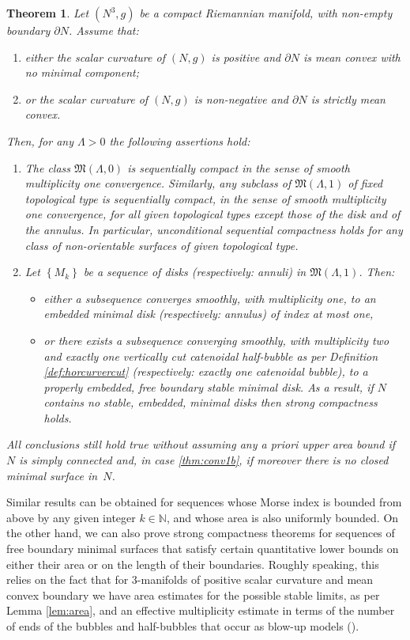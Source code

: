 \documentclass[JEP,XML,SOM,Unicode]{cedram}
\newenvironment{enumeratea}
{\bgroup\def\theenumi{\alph{enumi}}\begin{enumerate}}
{\end{enumerate}\egroup}
\newcounter{cas}
\newtheorem{thm}{Theorem}
\theoremstyle{definition}
\begin{document}
\begin{thm}\label{thm:conv1}
Let $(N^3,g)$ be a compact Riemannian manifold, with non-empty boundary $\partial N$. Assume that:
\begin{enumeratea}
\item\label{thm:conv1a}
\emph{either} the scalar curvature of $(N,g)$ is positive and $\partial N$ is mean convex with no minimal component;
\item\label{thm:conv1b}
\emph{or} the scalar curvature of $(N,g)$ is non-negative and $\partial N$ is strictly mean convex.
\end{enumeratea}
Then, for any $\Lambda>0$ the following assertions hold:
\begin{enumerate}
\item
The class $\mathfrak{M}(\Lambda,0)$ is sequentially compact in the sense of smooth multiplicity one convergence. Similarly, any subclass of $\mathfrak{M}(\Lambda, 1)$ of fixed topological type is sequen\-tially compact, in the sense of smooth multiplicity one convergence, for all given topological types except those of the disk and of the annulus. In particular, unconditional sequential compactness holds for any class of non-orientable surfaces of given topological type.

\item
Let $\left\{M_k\right\}$ be a sequence of disks (respectively: annuli) in $\mathfrak{M}(\Lambda, 1)$. Then:
\begin{itemize}
\item
\emph{either} a subsequence converges smoothly, with multiplicity one, to an embedded minimal disk (respectively: annulus) of index at most one,

\item
\emph{or} there exists a subsequence converging smoothly, with multiplicity two and exactly one vertically cut catenoidal half-bubble as per Definition \ref{def:horcurvercut} (respec\-tively: exactly one catenoidal bubble), to a properly embedded, free boundary stable minimal disk. As a result, if $N$ contains no stable, embedded, minimal disks then strong compactness holds.
\end{itemize}
\end{enumerate}
All conclusions still hold true without assuming any a priori upper area bound if~$N$ is simply connected and, in case \eqref{thm:conv1b}, if moreover there is no \emph{closed} minimal surface in~$N$.
\end{thm}

Similar results can be obtained for sequences whose Morse index is bounded from above by any given integer $k\in\mathbb{N}$, and whose area is also uniformly bounded. On the other hand, we can also prove strong compactness theorems for sequences of free boundary minimal surfaces that satisfy certain quantitative lower bounds on either their area or on the length of their boundaries. Roughly speaking, this relies on the fact that for 3-manifolds of positive scalar curvature and mean convex boundary we have area estimates for the possible stable limits, as per Lemma \ref{lem:area}, and an effective multiplicity estimate in terms of the number of ends of the bubbles and half-bubbles that occur as blow-up models (\cf \cite[Prop.\,13]{ABCS18}).
\end{document}
